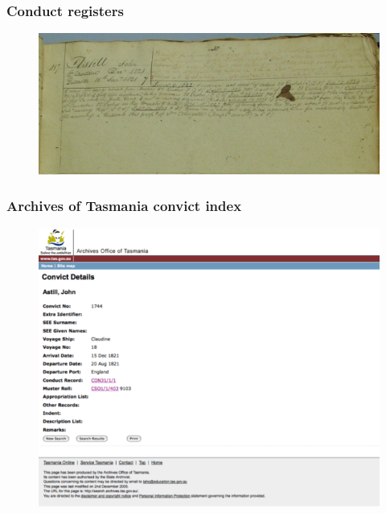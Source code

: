 \documentclass[ignorenonframetext,11pt]{beamer}
\begin{document}
\begin{frame}
\frametitle{Conduct registers}
\label{conductregisters}

\begin{figure}
	\label{johnastill}
	\begin{center}
	\includegraphics[keepaspectratio,width=\textwidth, height=.75\textheight]{images/Astill-cr.jpg}
	\end{center}
	\end{figure}
	



\end{frame}
		

\begin{frame}
\frametitle{Archives of Tasmania convict index}
\label{archivesoftasmaniaconvictindex}

\begin{figure}
	\label{convictsearch}
	\begin{center}
	\includegraphics[keepaspectratio,width=\textwidth, height=.75\textheight]{images/Astill-aot.png}
	\end{center}
	\end{figure}
	



\end{frame}
		
\end{document}
